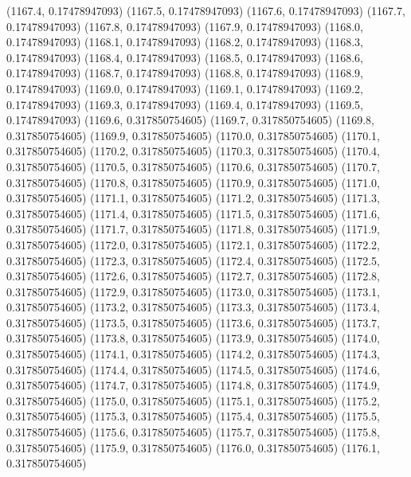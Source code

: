 {					(1167.4, 0.17478947093)
					(1167.5, 0.17478947093)
					(1167.6, 0.17478947093)
					(1167.7, 0.17478947093)
					(1167.8, 0.17478947093)
					(1167.9, 0.17478947093)
					(1168.0, 0.17478947093)
					(1168.1, 0.17478947093)
					(1168.2, 0.17478947093)
					(1168.3, 0.17478947093)
					(1168.4, 0.17478947093)
					(1168.5, 0.17478947093)
					(1168.6, 0.17478947093)
					(1168.7, 0.17478947093)
					(1168.8, 0.17478947093)
					(1168.9, 0.17478947093)
					(1169.0, 0.17478947093)
					(1169.1, 0.17478947093)
					(1169.2, 0.17478947093)
					(1169.3, 0.17478947093)
					(1169.4, 0.17478947093)
					(1169.5, 0.17478947093)
					(1169.6, 0.317850754605)
					(1169.7, 0.317850754605)
					(1169.8, 0.317850754605)
					(1169.9, 0.317850754605)
					(1170.0, 0.317850754605)
					(1170.1, 0.317850754605)
					(1170.2, 0.317850754605)
					(1170.3, 0.317850754605)
					(1170.4, 0.317850754605)
					(1170.5, 0.317850754605)
					(1170.6, 0.317850754605)
					(1170.7, 0.317850754605)
					(1170.8, 0.317850754605)
					(1170.9, 0.317850754605)
					(1171.0, 0.317850754605)
					(1171.1, 0.317850754605)
					(1171.2, 0.317850754605)
					(1171.3, 0.317850754605)
					(1171.4, 0.317850754605)
					(1171.5, 0.317850754605)
					(1171.6, 0.317850754605)
					(1171.7, 0.317850754605)
					(1171.8, 0.317850754605)
					(1171.9, 0.317850754605)
					(1172.0, 0.317850754605)
					(1172.1, 0.317850754605)
					(1172.2, 0.317850754605)
					(1172.3, 0.317850754605)
					(1172.4, 0.317850754605)
					(1172.5, 0.317850754605)
					(1172.6, 0.317850754605)
					(1172.7, 0.317850754605)
					(1172.8, 0.317850754605)
					(1172.9, 0.317850754605)
					(1173.0, 0.317850754605)
					(1173.1, 0.317850754605)
					(1173.2, 0.317850754605)
					(1173.3, 0.317850754605)
					(1173.4, 0.317850754605)
					(1173.5, 0.317850754605)
					(1173.6, 0.317850754605)
					(1173.7, 0.317850754605)
					(1173.8, 0.317850754605)
					(1173.9, 0.317850754605)
					(1174.0, 0.317850754605)
					(1174.1, 0.317850754605)
					(1174.2, 0.317850754605)
					(1174.3, 0.317850754605)
					(1174.4, 0.317850754605)
					(1174.5, 0.317850754605)
					(1174.6, 0.317850754605)
					(1174.7, 0.317850754605)
					(1174.8, 0.317850754605)
					(1174.9, 0.317850754605)
					(1175.0, 0.317850754605)
					(1175.1, 0.317850754605)
					(1175.2, 0.317850754605)
					(1175.3, 0.317850754605)
					(1175.4, 0.317850754605)
					(1175.5, 0.317850754605)
					(1175.6, 0.317850754605)
					(1175.7, 0.317850754605)
					(1175.8, 0.317850754605)
					(1175.9, 0.317850754605)
					(1176.0, 0.317850754605)
					(1176.1, 0.317850754605)
}
